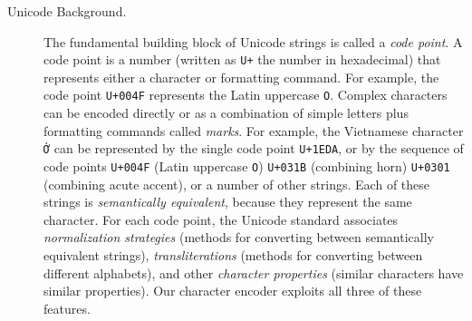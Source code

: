 \documentclass[sigconf,anonymous,review,10pt]{acmart}
\newcommand{\str}[1]{\texttt{#1}}
\newcommand{\defn}[1]{\textit{#1}}
\begin{document}
\begin{description}


\item[Unicode Background.]
The fundamental building block of Unicode strings is called a \defn{code point}.
A code point is a number (written as \str{U+} the number in hexadecimal)
that represents either a character or formatting command.
For example, the code point \str{U+004F} represents the Latin uppercase \str{O}.
Complex characters can be encoded directly or as a combination of simple letters plus formatting commands called \defn{marks}.
For example, the Vietnamese character \str{\foreignlanguage{vietnamese}{Ớ}} can be represented by the single code point \str{U+1EDA},
or by the sequence of code points \str{U+004F} (Latin uppercase \str{O}) \str{U+031B} (combining horn) \str{U+0301} (combining acute accent),
or a number of other strings.
Each of these strings is \defn{semantically equivalent},
because they represent the same character.
For each code point, the Unicode standard \citep{Unicode} associates 
\defn{normalization strategies} (methods for converting between semantically equivalent strings), 
\defn{transliterations} (methods for converting between different alphabets), 
and other \defn{character properties} (similar characters have similar properties).
Our character encoder exploits all three of these features.



\end{description}
\end{document}
